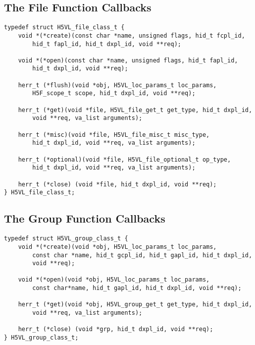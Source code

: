\subsection{The File Function Callbacks}

\begin{lstlisting}
typedef struct H5VL_file_class_t {
    void *(*create)(const char *name, unsigned flags, hid_t fcpl_id,
        hid_t fapl_id, hid_t dxpl_id, void **req);

    void *(*open)(const char *name, unsigned flags, hid_t fapl_id, 
        hid_t dxpl_id, void **req);

    herr_t (*flush)(void *obj, H5VL_loc_params_t loc_params, 
        H5F_scope_t scope, hid_t dxpl_id, void **req);

    herr_t (*get)(void *file, H5VL_file_get_t get_type, hid_t dxpl_id, 
        void **req, va_list arguments);

    herr_t (*misc)(void *file, H5VL_file_misc_t misc_type, 
        hid_t dxpl_id, void **req, va_list arguments);

    herr_t (*optional)(void *file, H5VL_file_optional_t op_type, 
        hid_t dxpl_id, void **req, va_list arguments);

    herr_t (*close) (void *file, hid_t dxpl_id, void **req);
} H5VL_file_class_t;
\end{lstlisting}

\subsection{The Group Function Callbacks}

\begin{lstlisting}
typedef struct H5VL_group_class_t {
    void *(*create)(void *obj, H5VL_loc_params_t loc_params, 
        const char *name, hid_t gcpl_id, hid_t gapl_id, hid_t dxpl_id, 
        void **req);

    void *(*open)(void *obj, H5VL_loc_params_t loc_params, 
        const char*name, hid_t gapl_id, hid_t dxpl_id, void **req);

    herr_t (*get)(void *obj, H5VL_group_get_t get_type, hid_t dxpl_id, 
        void **req, va_list arguments);

    herr_t (*close) (void *grp, hid_t dxpl_id, void **req);
} H5VL_group_class_t;
\end{lstlisting}

